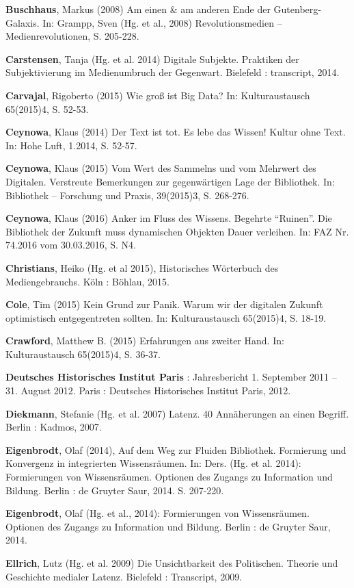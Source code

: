 \documentclass[a4paper,
fontsize=11pt,
oneside,
numbers=noperiodatend,
parskip=half-,
bibliography=totoc,
final
]{scrartcl}
\begin{document}
\textbf{Buschhaus}, Markus (2008) Am einen \& am anderen Ende der
Gutenberg-Galaxis. In: Grampp, Sven (Hg. et al., 2008) Revolutionsmedien
-- Medienrevolutionen, S. 205-228.

\textbf{Carstensen}, Tanja (Hg. et al. 2014) Digitale Subjekte.
Praktiken der Subjektivierung im Medienumbruch der Gegenwart. Bielefeld
: transcript, 2014.

\textbf{Carvajal}, Rigoberto (2015) Wie groß ist Big Data? In:
Kulturaustausch 65(2015)4, S. 52-53.

\textbf{Ceynowa}, Klaus (2014) Der Text ist tot. Es lebe das Wissen!
Kultur ohne Text. In: Hohe Luft, 1.2014, S. 52-57.

\textbf{Ceynowa}, Klaus (2015) Vom Wert des Sammelns und vom Mehrwert
des Digitalen. Verstreute Bemerkungen zur gegenwärtigen Lage der
Bibliothek. In: Bibliothek -- Forschung und Praxis, 39(2015)3, S.
268-276.

\textbf{Ceynowa}, Klaus (2016) Anker im Fluss des Wissens. Begehrte
\enquote{Ruinen}. Die Bibliothek der Zukunft muss dynamischen Objekten
Dauer verleihen. In: FAZ Nr. 74.2016 vom 30.03.2016, S. N4.

\textbf{Christians}, Heiko (Hg. et al 2015), Historisches Wörterbuch des
Mediengebrauchs. Köln : Böhlau, 2015.

\textbf{Cole}, Tim (2015) Kein Grund zur Panik. Warum wir der digitalen
Zukunft optimistisch entgegentreten sollten. In: Kulturaustausch
65(2015)4, S. 18-19.

\textbf{Crawford}, Matthew B. (2015) Erfahrungen aus zweiter Hand. In:
Kulturaustausch 65(2015)4, S. 36-37.

\textbf{Deutsches Historisches Institut Paris} : Jahresbericht 1.
September 2011 -- 31. August 2012. Paris : Deutsches Historisches
Institut Paris, 2012.

\textbf{Diekmann}, Stefanie (Hg. et al. 2007) Latenz. 40 Annäherungen an
einen Begriff. Berlin : Kadmos, 2007.

\textbf{Eigenbrodt}, Olaf (2014), Auf dem Weg zur Fluiden Bibliothek.
Formierung und Konvergenz in integrierten Wissensräumen. In: Ders. (Hg.
et al. 2014): Formierungen von Wissensräumen. Optionen des Zugangs zu
Information und Bildung. Berlin : de Gruyter Saur, 2014. S. 207-220.

\textbf{Eigenbrodt}, Olaf (Hg. et al., 2014): Formierungen von
Wissensräumen. Optionen des Zugangs zu Information und Bildung. Berlin :
de Gruyter Saur, 2014.

\textbf{Ellrich}, Lutz (Hg. et al. 2009) Die Unsichtbarkeit des
Politischen. Theorie und Geschichte medialer Latenz. Bielefeld :
Transcript, 2009.
\end{document}
